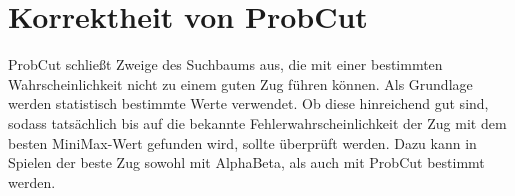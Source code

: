 
\section{Korrektheit von ProbCut}
ProbCut schließt Zweige des Suchbaums aus, die mit einer bestimmten Wahrscheinlichkeit nicht zu einem guten Zug führen
können. Als Grundlage werden statistisch bestimmte Werte verwendet. Ob diese hinreichend gut sind, sodass tatsächlich
bis auf die bekannte Fehlerwahrscheinlichkeit der Zug mit dem besten MiniMax-Wert gefunden wird, sollte überprüft
werden. Dazu kann in Spielen der beste Zug sowohl mit AlphaBeta, als auch mit ProbCut bestimmt werden.
